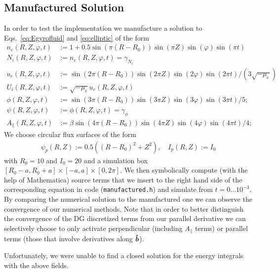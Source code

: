 

\subsection{Manufactured Solution}
In order to test the implementation we manufacture a solution to Eqs.~\eqref{eq:Egyrofluid} and \eqref{eq:elliptic} of the form
\begin{align*}
n_e(R,Z,\varphi, t) &:= 1 + 0.5\sin(\pi(R-R_0))\sin(\pi Z)\sin(\varphi)\sin(\pi t) \\
N_i(R,Z,\varphi, t) &:= n_e(R,Z,\varphi,t) = \gamma_{ N_i}  \\
u_e(R,Z,\varphi, t) &:= \sin(2\pi(R-R_0))\sin(2\pi Z)\sin(2\varphi)\sin(2\pi t)/(3\sqrt{-\mu_e}) \\
U_i(R,Z,\varphi, t) &:= \sqrt{-\mu_e}u_e(R,Z,\varphi,t) \\
\phi(R,Z,\varphi,t) &:= \sin(3\pi(R-R_0))\sin(3\pi Z)\sin(3\varphi)\sin(3\pi t)/5; \\
\psi(R,Z,\varphi,t) &:= \phi(R,Z,\varphi, t) = \gamma_{\phi} \\
A_\parallel( R,Z,\varphi,t) &:= \beta\sin(4\pi(R-R_0))\sin(4\pi Z)\sin(4\varphi)\sin(4\pi t)/4;
\end{align*}
We choose circular flux surfaces of the form
\begin{align*}
\psi_p(R,Z) :=0.5((R-R_0)^2 + Z^2),\quad
I_p(R,Z):=I_0
\end{align*}
with $R_0=10$ and $I_0=20$ and a simulation box $[R_0-a,R_0+a]\times[-a,a]\times[0,2\pi]$.
We then symbolically compute (with the help of Mathematica) source terms that we insert to the right hand side of
the corresponding equation in code (\texttt{manufactured.h}) and simulate from $t=0...10^{-3}$.
By comparing the numerical solution to the manufactured one we can observe the convergence of our numerical methods. Note that in order to better distinguish
the convergence of the DG discretized terms from our parallel derivative
we can selectively choose to only activate perpendicular (including $A_\parallel$ terms) or parallel terms (those that involve derivatives along $\bm{\hat{b}}$).

Unfortunately, we were unable to find a closed solution for the energy integrals with the above fields.

